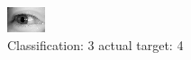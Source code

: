 \begin{figure}[h!]
\begin{center}
\includegraphics[width=0.60\columnwidth]{figures/ID3110_class_3_target_4.png}
\end{center}
\caption{ Classification: 3 actual target: 4}
\label{fig:ID3110_class_3_target_4}
\end{figure}
